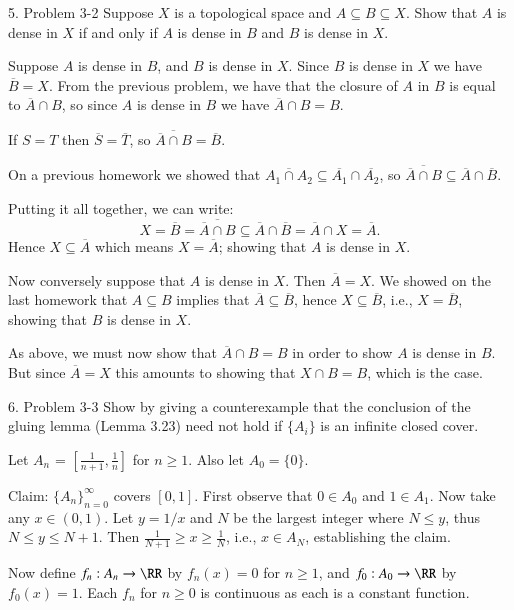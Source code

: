 \documentclass{homework}
\newcommand{\nextprob}{\newpage}
\newcommand{\ra}{\rightarrow}
\begin{document}
\nextprob
\begin{exercise}{5. Problem 3-2}
Suppose $X$ is a topological space and $A\subseteq B\subseteq X$.  Show that $A$
is dense in $X$ if and only if $A$ is dense in $B$ and $B$ is dense in $X$.
\end{exercise}
\solution
Suppose $A$ is dense in $B$, and $B$ is dense in $X$.  Since $B$ is dense in $X$
we have $\overline{B}=X$.  From the previous problem, we have that
the closure of $A$ in $B$ is equal to $\overline{A}\cap B$, so since $A$ is dense
in $B$ we have $\overline{A}\cap B=B$.

If $S=T$ then $\overline{S}=\overline{T}$, so
$ \overline{\overline{A}\cap B}=\overline{B}.$

On a previous homework we showed that
$\overline{A_1\cap A_2}\subseteq \overline{A_1}\cap\overline{A_2}$, so
$\overline{\overline{A}\cap B}\subseteq \overline{A}\cap\overline{B}$.

Putting it all together, we can write:
$$ X=\overline{B}=\overline{\overline{A}\cap B}\subseteq
\overline{A}\cap\overline{B}=\overline{A}\cap X=\overline{A}. $$
Hence $X\subseteq\overline{A}$ which means $X=\overline{A}$; showing that
$A$ is dense in $X$.

Now conversely suppose that $A$ is dense in $X$.  Then $\overline{A}=X$.
We showed on the last homework that $A\subseteq B$ implies
that $\overline{A}\subseteq\overline{B}$,
hence $X\subseteq\overline{B}$, i.e., $X=\overline{B}$,
showing that $B$ is dense in $X$.

As above, we must now show that $\overline{A}\cap B=B$ in order
to show $A$ is dense in $B$.  But since $\overline{A}=X$ this
amounts to showing that $X\cap B=B$, which is the case.

\nextprob
\begin{exercise}{6. Problem 3-3}
Show by giving a counterexample that the conclusion of the gluing lemma
(Lemma 3.23) need not hold if $\{A_i\}$ is an infinite closed cover.
\end{exercise}
\solution
Let $A_n$ = $[\frac{1}{n+1}, \frac{1}{n}]$ for $n\ge 1$.
Also let $A_0=\{0\}$.

Claim: $\{A_n\}_{n=0}^{\infty}$ covers $[0,1]$.  First observe that
$0\in A_0$ and $1\in A_1$.  Now take any $x\in(0,1)$. Let $y=1/x$ and
$N$ be the largest integer where $N\le y$, thus $N\le y\le N+1$. 
Then
$\frac{1}{N+1}\ge x\ge \frac{1}{N}$, i.e., $x\in A_N$, establishing the claim.

Now define $f_n:A_n\ra\RR$ by $f_n(x)=0$ for $n\ge 1$, and
$f_0:A_0\ra\RR$ by $f_0(x)=1$.  Each $f_n$ for $n\ge 0$ is
continuous as each is a constant function.
\end{document}
